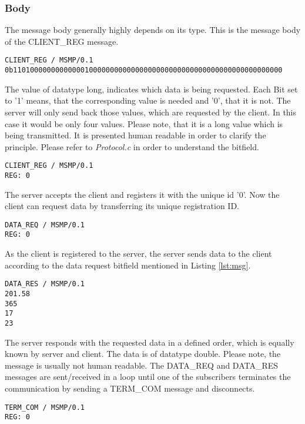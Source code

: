 \subsubsection{Body}

The message body generally highly depends on its type. This is the message body of the CLIENT\_REG message.
\begin{lstlisting}[caption={Client registers to server}, label=lst:msg]
CLIENT_REG / MSMP/0.1
0b1101000000000000010000000000000000000000000000000000000000000000
\end{lstlisting}
The value of datatype long, indicates which data is being requested. Each Bit set to '1' means, that the corresponding value is needed and '0', that it is not. The server will only send back those values, which are requested by the client. In this case it would be only four values. Please note, that it is a long value which is being transmitted. It is presented human readable in order to clarify the principle.\newline
Please refer to \textit{Protocol.c} in order to understand the bitfield.\newline
\begin{lstlisting}[caption={Server registers client}, label=lst:msg1]
CLIENT_REG / MSMP/0.1
REG: 0
\end{lstlisting}
The server accepts the client and registers it with the unique id '0'. Now the client can request data by transferring its unique registration ID.\newline
\begin{lstlisting}[caption={Client requests data}, label=lst:msg2]
DATA_REQ / MSMP/0.1
REG: 0
\end{lstlisting}
As the client is registered to the server, the server sends data to the client according to the data request bitfield mentioned in Listing \ref{lst:msg}.\newline
\begin{lstlisting}[caption={Server responds with needed data}, label=lst:msg3]
DATA_RES / MSMP/0.1
201.58
365
17
23
\end{lstlisting}
The server responds with the requested data in a defined order, which is equally known by server and client. The data is of datatype double. Please note, the message is usually not human readable.\newline
The DATA\_REQ and DATA\_RES messages are sent/received in a loop until one of the subscribers terminates the communication by sending a TERM\_COM message and disconnects.
\begin{lstlisting}[caption={Client terminates communication}, label=lst:msg4]
TERM_COM / MSMP/0.1
REG: 0
\end{lstlisting}

